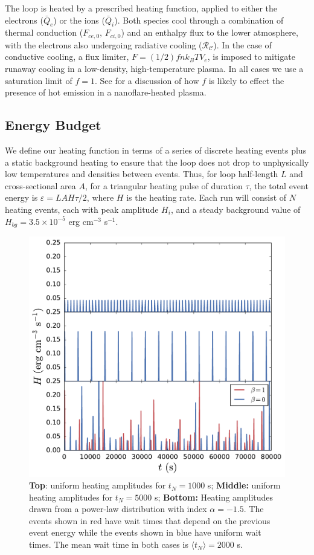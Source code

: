 \documentclass[apj]{emulateapj}
\begin{document}
	\par The loop is heated by a prescribed heating function, applied to either the electrons ($\bar{Q}_e$) or the ions ($\bar{Q}_i$). Both species cool through a combination of thermal conduction ($F_{ce,0},\,F_{ci,0}$) and an enthalpy flux to the lower atmosphere, with the electrons also undergoing radiative cooling ($\mathcal{R_C}$). In the case of conductive cooling, a flux limiter, $F=(1/2)fnk_BTV_e$, is imposed to mitigate runaway cooling in a low-density, high-temperature plasma. In all cases we use a saturation limit of $f=1$. See  for a discussion of how $f$ is likely to effect the presence of hot emission in a nanoflare-heated plasma.
	\subsection{Energy Budget}
	\label{subsec:params}
	\par We define our heating function in terms of a series of discrete heating events plus a static background heating to ensure that the loop does not drop to unphysically low temperatures and densities between events. Thus, for loop half-length $L$ and cross-sectional area $A$, for a triangular heating pulse of duration $\tau$, the total  event energy is $\varepsilon=LAH\tau/2$, where $H$ is the heating rate. Each run will consist of $N$ heating events, each with peak amplitude $H_i$, and a steady background value of $H_{bg}=3.5\times10^{-5}$ erg cm$^{-3}$ s$^{-1}$.
	\begin{figure}
		\centering
		\includegraphics[width=\columnwidth]{figures/heating_functions.pdf}
		\caption{\textbf{Top}: uniform heating amplitudes for $t_N=1000$ s; \textbf{Middle:} uniform heating amplitudes for $t_N=5000$ s; \textbf{Bottom:} Heating amplitudes drawn from a power-law distribution with index $\alpha=-1.5$. The events shown in red have wait times that depend on the previous event energy while the events shown in blue have uniform wait times. The mean wait time in both cases is $\langle t_N\rangle=2000$ s.}
		\label{fig:heating_funcs}
	\end{figure}
\end{document}
